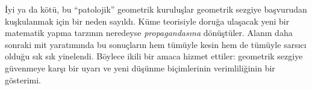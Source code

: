 İyi ya da kötü, bu ``patolojik'' geometrik kuruluşlar geometrik sezgiye
başvurudan kuşkulanmak için bir neden sayıldı. Küme teorisiyle doruğa ulaşacak
yeni bir matematik yapma tarzının neredeyse \emph{propagandasına} dönüştüler.
Alanın daha sonraki mit yaratımında bu sonuçların hem tümüyle kesin hem de
tümüyle sarsıcı olduğu sık sık yinelendi. Böylece ikili bir amaca hizmet
ettiler: geometrik sezgiye güvenmeye karşı bir uyarı ve yeni düşünme
biçimlerinin verimliliğinin bir gösterimi.

